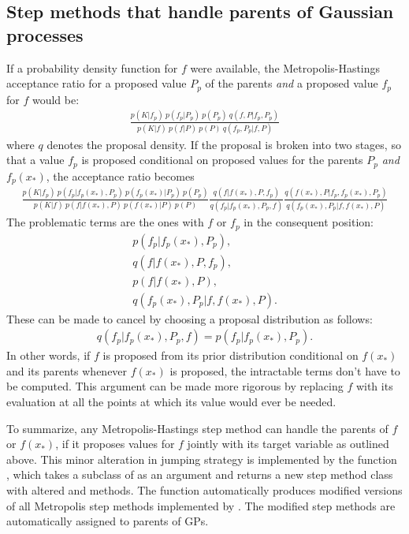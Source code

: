 \documentclass[article]{jss}
\begin{document}
\subsection{Step methods that handle parents of Gaussian processes}
If a probability density function for $f$ were available, the Metropolis-Hastings acceptance ratio for a proposed value $P_p$ of the parents \emph{and} a proposed value $f_p$ for $f$ would be:
\begin{eqnarray*}
    \frac{p(K|f_p)\ p(f_p|P_p)\ p(P_p)\ q(f,P|f_p,P_p)}{p(K|f)\ p(f|P)\ p(P)\ q(f_p,P_p|f,P)}
\end{eqnarray*}
where $q$ denotes the proposal density. If the proposal is broken into two stages, so that a value $f_p$ is proposed conditional on proposed values for the parents $P_p$ \emph{and} $f_p(x_*)$, the acceptance ratio becomes
\begin{eqnarray*}
    \frac{p(K|f_p)\ p(f_p|f_p(x_*), P_p)\ p(f_p(x_*) | P_p)\ p(P_p)}{p(K|f)\ p(f|f(x_*), P)\ p(f(x_*) | P)\ p(P)}
    \frac{q(f|f(x_*),P,f_p)  }{q(f_p|f_p(x_*),P_p,f)}
    \frac{q(f(x_*),P|f_p,f_p(x_*),P_p)}{q(f_p(x_*),P_p|f,f(x_*), P)}
\end{eqnarray*}
 The problematic terms are the ones with $f$ or $f_p$ in the consequent position:
\begin{eqnarray*}
    p(f_p|f_p(x_*), P_p),\\ q(f|f(x_*),P,f_p),\\ p(f|f(x_*), P),\\ q(f_p(x_*),P_p|f,f(x_*), P).
\end{eqnarray*}
These can be made to cancel by choosing a proposal distribution as follows:
\begin{eqnarray*}
    q(f_p|f_p(x_*),P_p,f) = p(f_p|f_p(x_*), P_p).
\end{eqnarray*}
In other words, if $f$ is proposed from its prior distribution conditional on $f(x_*)$ and its parents whenever $f(x_*)$ is proposed, the intractable terms don't have to be computed. This argument can be made more rigorous by replacing $f$ with its evaluation at all the points at which its value would ever be needed.

\smallskip

To summarize, any Metropolis-Hastings step method can handle the parents of $f$ or $f(x_*)$, if it proposes values for $f$ jointly with its target variable as outlined above. This minor alteration in jumping strategy is implemented by the function \\, which takes a subclass of  as an argument and returns a new step method class with altered  and  methods. The function automatically produces modified versions of all Metropolis step methods implemented by  \citep{pymc}. The modified step methods are automatically assigned to parents of GPs.
\end{document}

